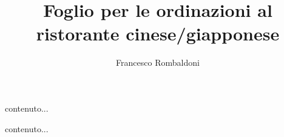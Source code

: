 \documentclass[hidelinks,12pt,a4paper]{article}
\newcommand{\backGroundImage}{
example-image
}
\newcommand{\orderSheet}{
	
	\begin{center}
		\begin{minipage}{0.9\textwidth}
				\begin{roundCornerPage}[roundcorner=15pt]
					\begin{minipage}[t][0.7\textwidth][t]{\textwidth}
						contenuto...
					\end{minipage}
				\end{roundCornerPage}	
		\end{minipage}
	\end{center}

}
\begin{document}
	
	\pagestyle{empty}
	
	\title{\textbf{Foglio per le ordinazioni al ristorante cinese/giapponese}}
	\author{Francesco Rombaldoni}
	\date{}
	
	\maketitle
	\newpage
	
	
	
	
	\orderSheet
	\vspace*{5mm}
	\orderSheet
	
	
	\newpage
	\vspace*{\fill}
	\begin{center}
		\begin{minipage}{0.8\linewidth}
			\doclicenseThis
		\end{minipage}
	\end{center}
	
\end{document}
